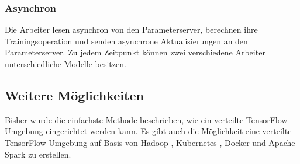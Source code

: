 \subsubsection{Asynchron}
Die Arbeiter lesen asynchron von den Parameterserver, berechnen ihre Trainingsoperation und senden asynchrone Aktualisierungen an den Parameterserver. Zu jedem Zeitpunkt können zwei verschiedene Arbeiter unterschiedliche Modelle besitzen.

\subsection{Weitere Möglichkeiten}
Bisher wurde die einfachste Methode beschrieben, wie ein verteilte TensorFlow Umgebung eingerichtet werden kann. Es gibt auch die Möglichkeit eine verteilte TensorFlow Umgebung auf Basis von Hadoop \cite{tensorflowhadoop}, Kubernetes \cite{tensorflowkubernetes}, Docker \cite{tensorflowdocker} und Apache Spark \cite{tensorflowspark} zu erstellen.




